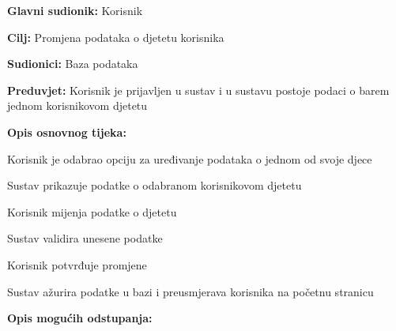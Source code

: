 					\noindent {}
					\begin{packed_item}
	
						\item \textbf{Glavni sudionik: }Korisnik
						\item  \textbf{Cilj:} Promjena podataka o djetetu korisnika
						\item  \textbf{Sudionici:} Baza podataka
						\item  \textbf{Preduvjet:} Korisnik je prijavljen u sustav i u sustavu postoje podaci o barem jednom korisnikovom djetetu
						\item  \textbf{Opis osnovnog tijeka:}
						
						\item[] \begin{packed_enum}
							\item Korisnik je odabrao opciju za uređivanje podataka o jednom od svoje djece
							\item Sustav prikazuje podatke o odabranom korisnikovom djetetu
							\item Korisnik mijenja podatke o djetetu
							\item Sustav validira unesene podatke
							\item Korisnik potvrđuje promjene
							\item Sustav ažurira podatke u bazi i preusmjerava korisnika na početnu stranicu
						\end{packed_enum}

						\eject

						\item  \textbf{Opis mogućih odstupanja:}


\end{packed_item}
